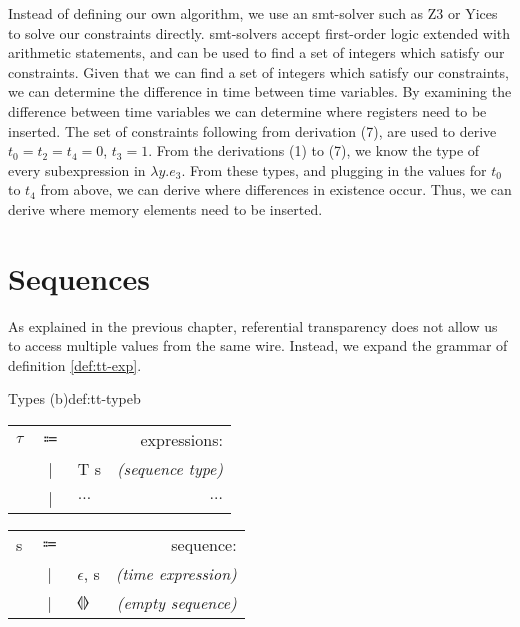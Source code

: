 Instead of defining our own algorithm, we use an \gls{smt}-solver such as Z3\cite{de2008z3} or Yices\cite{dutertre2006yices} to solve our constraints directly.
\gls{smt}-solvers accept first-order logic extended with arithmetic statements, and can be used to find a set of integers which satisfy our constraints.
Given that we can find a set of integers which satisfy our constraints, we can determine the difference in time between time variables.
By examining the difference between time variables we can determine where registers need to be inserted.
The set of constraints following from {derivation \scriptsize (7)}, are used to derive $t_0 = t_2 = t_4 = 0$, $t_3 = 1$.
From the derivations {\scriptsize (1)} to {\scriptsize (7)}, we know the type of every subexpression in $\lambda y.e_3$.
From these types, and plugging in the values for $t_0$ to $t_4$ from above, we can derive where differences in existence occur.
Thus, we can derive where memory elements need to be inserted.

\section{Sequences}
As explained in the previous chapter, referential transparency does not allow us to access multiple values from the same wire.
Instead, we expand the grammar of definition \ref{def:tt-exp}.

\begin{definitiontitled}{Types (b)}{def:tt-typeb}
\begin{minipage}[b]{0.50\linewidth}
\begin{tabular}{lclr}
$\tau$  & $\Coloneqq$ &                                         & expressions:            \\
        & |           & T s                                     & \textit{(sequence type)}  \\
        & |           & $\ldots$                                & $\ldots$                \\
\end{tabular}
\end{minipage}
\begin{minipage}[b]{0.40\linewidth}
\begin{tabular}{lclr}
s       & $\Coloneqq$ &                                         & sequence:                   \\
        & |           & $\epsilon$, s                           & \textit{(time expression)}  \\
        & |           & $\llangle \rrangle$       & \textit{(empty sequence)}   \\
\end{tabular}
\end{minipage}
\end{definitiontitled}

